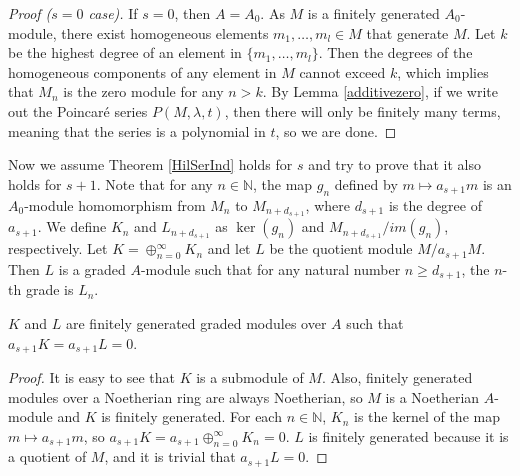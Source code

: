 \begin{proof}[Proof ($s=0$ case)]
If $s=0$, then $A=A_0$. As $M$ is a finitely generated $A_0$-module, there exist homogeneous elements $m_1,\ldots,m_l\in{M}$ that generate $M$. Let $k$ be the highest degree of an element in $\{m_1,\ldots,m_l\}$. Then the degrees of the homogeneous components of any element in $M$ cannot exceed $k$, which implies that $M_n$ is the zero module for any $n>k$. By Lemma \ref{additivezero}, if we write out the Poincar\'e series $P(M,\lambda,t)$, then there will only be finitely many terms, meaning that the series is a polynomial in $t$, so we are done.
\end{proof}

Now we assume Theorem \ref{HilSerInd} holds for $s$ and try to prove that it also holds for $s+1$. Note that for any $n\in{\mathbb{N}}$, the map $g_n$ defined by $m\mapsto{a_{s+1}}m$ is an $A_0$-module homomorphism from $M_n$ to $M_{n+d_{s+1}}$, where $d_{s+1}$ is the degree of $a_{s+1}$. We define $K_n$ and $L_{n+{d_{s+1}}}$ as $\operatorname{ker}(g_n)$ and $M_{n+d_{s+1}}/im(g_n)$, respectively. Let $K=\oplus_{n=0}^{\infty}K_n$ and let $L$ be the quotient module $M/a_{s+1}M$. Then $L$ is a graded $A$-module such that for any natural number $n\ge{d_{s+1}}$, the $n$-th grade is $L_{n}$.

\begin{lemma}
\label{KLprop}
$K$ and $L$ are finitely generated graded modules over $A$ such that $a_{s+1}K=a_{s+1}L=0$.
\end{lemma}
\begin{proof}
It is easy to see that $K$ is a submodule of $M$. Also, finitely generated modules over a Noetherian ring are always Noetherian, so $M$ is a Noetherian $A$-module and $K$ is finitely generated. For each $n\in\mathbb{N}$, $K_n$ is the kernel of the map $m\mapsto{a_{s+1}}m$, so $a_{s+1}{K}=a_{s+1}\oplus_{n=0}^{\infty}K_n=0$. $L$ is finitely generated because it is a quotient of $M$, and it is trivial that $a_{s+1}L=0$.
\end{proof}

